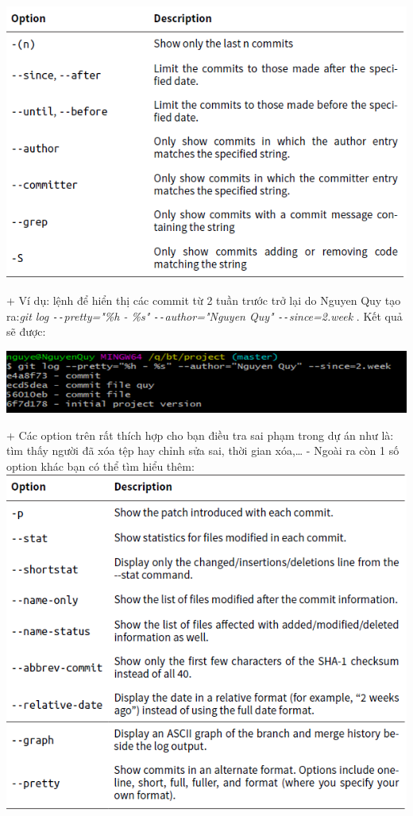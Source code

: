 \documentclass[12pt,a4paper]{report}
\begin{document}
	\includegraphics[width=0.8\linewidth]{screenshot023}

	\label{fig:screenshot023}
\vskip 0.4cm\vskip 0.4cm
+ Ví dụ: lệnh để hiển thị các commit từ 2 tuần trước trở lại do Nguyen Quy tạo ra:{\it git log \texttt{-{}-}pretty="\%h - \%s" \texttt{-{}-}author="Nguyen Quy" \texttt{-{}-}since=2.week }. Kết quả sẽ được:\vskip 0.4cm

	\includegraphics[width=0.8\linewidth]{screenshot024}

	\label{fig:screenshot024}
\vskip 0.4cm\vskip 0.4cm
+ Các option trên rất thích hợp cho bạn điều tra sai phạm trong dự án như là: tìm thấy người đã xóa tệp hay chỉnh sửa sai, thời gian xóa,…\vskip 0.4cm
- Ngoài ra còn 1 số option khác bạn có thể tìm hiểu thêm:
\vskip 0.4cm
	\includegraphics[width=0.8\linewidth]{screenshot025}
\end{document}
